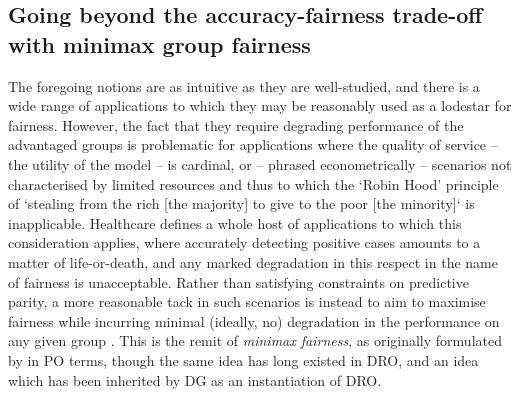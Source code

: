 \subsection{Going beyond the accuracy-fairness trade-off with minimax group
fairness}\label{ssec:minimax-fairness}
The foregoing notions are as intuitive as they are well-studied, and there is a wide
range of applications to which they may be reasonably used as a lodestar for fairness.
%
However, the fact that they require degrading performance of the advantaged groups is problematic
for applications where the quality of service -- the utility of the model -- is cardinal, or --
phrased econometrically -- scenarios not characterised by limited resources  and thus to which the
`Robin Hood' principle of `stealing from the rich [the majority] to give to the poor [the
minority]` is inapplicable.
%
Healthcare defines a whole host of applications to which this consideration applies, where
accurately detecting positive cases amounts to a matter of life-or-death, and any marked
degradation in this respect in the name of fairness is unacceptable. 
%
Rather than satisfying constraints on predictive parity, a more reasonable tack in such scenarios
is instead to aim to maximise fairness while incurring minimal (ideally, no) degradation in the
performance on any given group \citep{ustun2019fairness}.
%
This is the remit of \emph{minimax fairness}, as originally formulated by
\citep{martinez2020minimax} in \acf{PO} terms, though the same idea has long existed in \acf{DRO},
and an idea which has been inherited by \ac{DG} as an instantiation of \ac{DRO}. 
%


